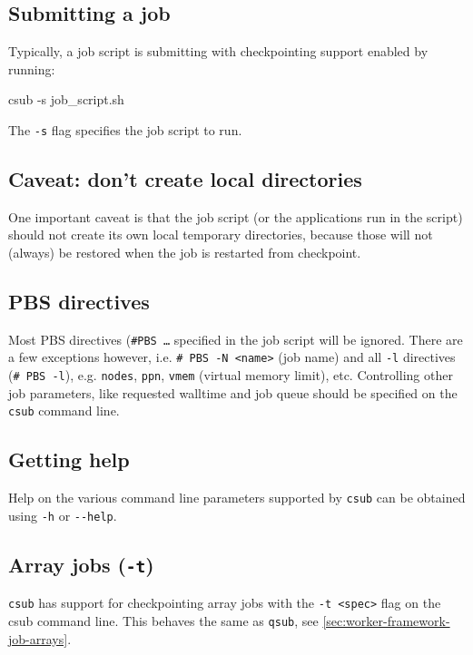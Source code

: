 \subsection{Submitting a job}

Typically, a job script is submitting with checkpointing support enabled by running:

\begin{prompt}
csub -s job_script.sh
\end{prompt}

The  \lstinline|-s| flag specifies the job script to run.

\subsection{Caveat: don't create local directories}

One important caveat is that the job script (or the applications run in the script)
should not create its own local temporary directories, because those will not (always)
be restored when the job is restarted from checkpoint.

\subsection{PBS directives}

Most PBS directives (\texttt{\#PBS \ldots} specified in the job script will be ignored.
There are a few exceptions however, i.e. \lstinline|# PBS -N <name>| (job name)
and all \lstinline|-l| directives (\lstinline|# PBS -l|), e.g. \lstinline|nodes|,
\lstinline|ppn|, \lstinline|vmem| (virtual memory limit), etc.
Controlling other job parameters, like requested walltime and job queue should be
specified on the \lstinline|csub| command line.

\subsection{Getting help}

Help on the various command line parameters supported by \lstinline|csub| can be
obtained using \lstinline|-h| or \lstinline|--help|.


\subsection{Array jobs (\texttt{-t})}

\lstinline|csub| has support for checkpointing array jobs with the \lstinline|-t <spec>|
flag on the csub command line. This behaves the same as \lstinline|qsub|, see \autoref{sec:worker-framework-job-arrays}.

